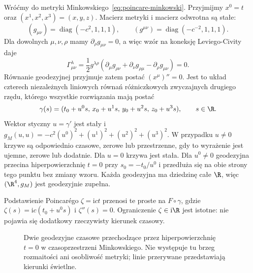 \begin{przyklad}
\label{prz:poincare-geodezyjne}
Wróćmy do metryki Minkowskiego~\eqref{eq:poincare-minkowski}.
Przyjmijmy $x^0=t$ oraz $(x^1,x^2,x^3)=(x,y,z)$.
Macierz metryki i macierz odwrotna są stałe:
\[
 (g_{\mu\nu})=\operatorname{diag}(-c^2,1,1,1),\qquad
 (g^{\mu\nu})=\operatorname{diag}(-c^{-2},1,1,1).
\]
Dla dowolnych $\mu,\nu,\rho$ mamy
$\partial_\rho g_{\mu\nu}=0$, a więc wzór
na koneksję Leviego-Civity daje
\begin{equation}\label{eq:poincare-christoffel}
 \Gamma^\lambda_{\mu\nu}
 =\frac12g^{\lambda\rho}
 (\partial_\mu g_{\rho\nu}+\partial_\nu g_{\rho\mu}
 -\partial_\rho g_{\mu\nu})=0.
\end{equation}
Równanie geodezyjnej przyjmuje zatem postać
$(x^\mu)''=0$. Jest to układ czterech niezależnych
liniowych równań różniczkowych zwyczajnych drugiego
rzędu, którego wszystkie rozwiązania mają postać
\begin{equation}\label{eq:poincare-geodezyjne}
 \gamma(s)=(t_0+u^0s,\,x_0+u^1s,\,
 y_0+u^2s,\,z_0+u^3s),\qquad s\in\R.
\end{equation}
Wektor styczny $u=\gamma'$ jest stały i
$g_M(u,u)=-c^2(u^0)^2+(u^1)^2+(u^2)^2+(u^3)^2$.
W przypadku $u\ne0$ krzywe są odpowiednio czasowe,
zerowe lub przestrzenne, gdy to wyrażenie jest
ujemne, zerowe lub dodatnie. Dla $u=0$ krzywa jest stała.
Dla $u^0\neq0$ geodezyjna przecina hiperpowierzchnię
$t=0$ przy $s_0=-t_0/u^0$ i przedłuża się na obie
strony tego punktu bez zmiany wzoru.
Każda geodezyjna ma dziedzinę całe $\R$,
więc $(\R^4,g_M)$ jest geodezyjnie zupełna.

Podstawienie Poincarégo $\zeta=\mathrm{i}ct$ przenosi
te proste na $F\circ\gamma$, gdzie
$\zeta(s)=\mathrm{i}c(t_0+u^0s)$ i $\zeta''(s)=0$.
Ograniczenie $\zeta\in\mathrm{i}\R$ jest istotne:
nie pojawia się dodatkowy rzeczywisty kierunek czasowy.

\begin{figure}[htbp]
\centering
{}
\caption{Dwie geodezyjne czasowe przechodzące przez
hiperpowierzchnię $t=0$ w czasoprzestrzeni Minkowskiego.
Nie występuje tu brzeg rozmaitości ani osobliwość
metryki; linie przerywane przedstawiają kierunki świetlne.}
\label{fig:poincare-geodezyjne-zero}
\end{figure}
\end{przyklad}

